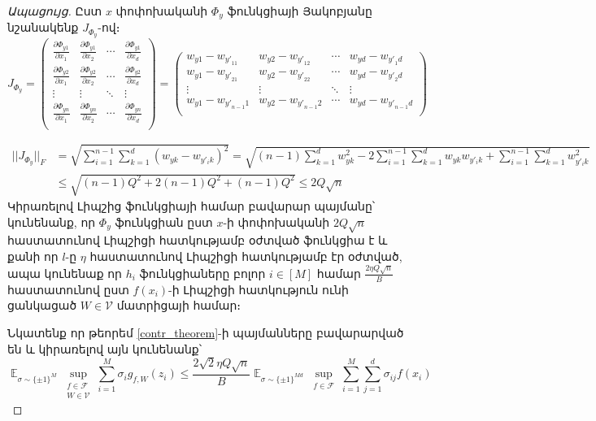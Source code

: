 \documentclass[12pt]{article}
\DeclareMathOperator*{\E}{\mathbb{E}}
\begin{document}
\begin{proof}[Ապացույց]
Ըստ $x$ փոփոխականի $\Phi_y$  ֆունկցիայի Յակոբյանը նշանակենք $J_{\Phi_y} $-ով։
$$J_{\Phi_y}  = 
 \begin{pmatrix}
 \frac{\partial \Phi_{y1}}{\partial x_1} & \frac{\partial \Phi_{y1}}{\partial x_2} & \cdots & \frac{\partial \Phi_{y1}}{\partial x_d} \\
  \frac{\partial \Phi_{y2}}{\partial x_1} & \frac{\partial \Phi_{y2}}{\partial x_2} & \cdots & \frac{\partial \Phi_{y2}}{\partial x_d} \\
  \vdots  & \vdots  & \ddots & \vdots  \\
  \frac{\partial \Phi_{yn}}{\partial x_1} & \frac{\partial \Phi_{yn}}{\partial x_2} & \cdots & \frac{\partial \Phi_{yn}}{\partial x_d} \\
 \end{pmatrix} =
 \begin{pmatrix}
 w_{y1} - w_{{y'}_11} & w_{y2} - w_{{y'}_12} & \cdots & w_{yd} - w_{{y'}_1d} \\
   w_{y1} - w_{{y'}_21} & w_{y2} - w_{{y'}_22} & \cdots & w_{yd} - w_{{y'}_2d} \\
  \vdots  & \vdots  & \ddots & \vdots  \\
  w_{y1} - w_{{y'}_{n-1}1} & w_{y2} - w_{{y'}_{n-1}2} & \cdots & w_{yd} - w_{{y'}_{n-1}d} \\
 \end{pmatrix}
 $$

\begin{align*}
||J_{\Phi_y}||_F &= \sqrt{\sum_{i = 1}^{n-1} \sum_{k = 1}^d    \left(w_{yk} - w_{y'_ik}\right)^2} = \sqrt{(n-1)\sum_{k =1}^d w^2_{yk}   - 2 \sum_{i=1}^{n-1} \sum_{k=1}^d w_{yk} w_{y'_ik}  + \sum_{i=1}^{n-1} \sum_{k=1}^d  w^2_{y'_ik} } \\
&\leq  \sqrt{(n-1)Q^2+2(n-1)Q^2+(n-1)Q^2} \leq 2Q\sqrt{n}
\end{align*}
Կիրառելով Լիպշից ֆունկցիայի համար բավարար պայմանը՝ կունենանք, որ $\Phi_y$ ֆունկցիան  ըստ $x$-ի փոփոխականի $2Q\sqrt{n}$ հաստատունով Լիպշիցի հատկությամբ օժտված ֆունկցիա է և քանի որ $l$-ը $\eta$ հաստատունով Լիպշիցի հատկությամբ էր օժտված, ապա կունենաք որ $h_i$ ֆունկցիաները բոլոր $i \in [M]$ համար $\frac{2 \eta Q\sqrt{n}}{B}$ հաստատունով ըստ $f(x_i)$-ի Լիպշիցի հատկություն ունի ցանկացած $W \in \mathcal{V}$ մատրիցայի համար։


Նկատենք  որ թեորեմ  \ref{contr_theorem}-ի պայմանները բավարարված են և կիրառելով այն կունենանք՝
$$\E_{\sigma \sim \{\pm1\}^M} \sup_{\substack{ f  \in \mathcal{F}  \\ W \in \mathcal{V}}}\sum_{i=1}^M \sigma_ig_{f,W}(z_i) \leq  \frac{2\sqrt{2} \eta Q\sqrt{n}}{B}        \E_{\sigma \sim \{\pm1\}^{Md}} \sup_{\substack{ f  \in \mathcal{F}  }}\sum_{i=1}^M \sum_{j=1}^d \sigma_{ij}f(x_i)$$



\end{proof}
\end{document}
